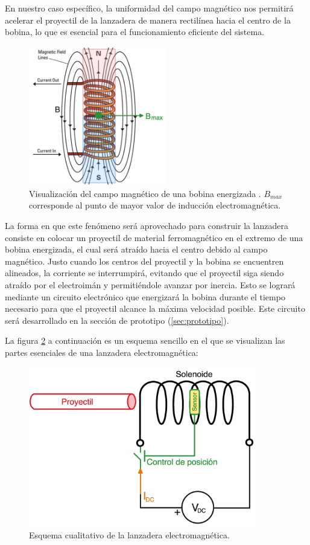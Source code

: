 En nuestro caso específico, la uniformidad del campo magnético nos permitirá acelerar el proyectil de la lanzadera de manera rectilínea hacia el centro de la bobina, lo que es esencial para el funcionamiento eficiente del sistema.

\begin{figure}[H]
    \centering %
    \includegraphics[width=6cm]{FigurasMemoria/electromagnet.png}
    \caption{Visualización del campo magnético de una bobina energizada \citep{northeastern2024electromagnets}. \(B_{max}\) corresponde al punto de mayor valor de inducción electromagnética.}
    \label{fig:electromagnet} %
\end{figure}

La forma en que este fenómeno será aprovechado para construir la lanzadera consiste en colocar un proyectil de material ferromagnético en el extremo de una bobina energizada, el cual será atraído hacia el centro debido al campo magnético. Justo cuando los centros del proyectil y la bobina se encuentren alineados, la corriente se interrumpirá, evitando que el proyectil siga siendo atraído por el electroimán y permitiéndole avanzar por inercia. Esto se logrará mediante un circuito electrónico que energizará la bobina durante el tiempo necesario para que el proyectil alcance la máxima velocidad posible. Este circuito será desarrollado en la sección de prototipo (\ref{sec:prototipo}).

La figura \ref{fig:esquemabasico} a continuación es un esquema sencillo en el que se visualizan las partes esenciales de una lanzadera electromagnética:

\begin{figure}[H]
    \centering %
    \includegraphics[width=10cm]{FigurasMemoria/esquemabasico.png}
    \caption{Esquema cualitativo de la lanzadera electromagnética.}
    \label{fig:esquemabasico} %
\end{figure}

